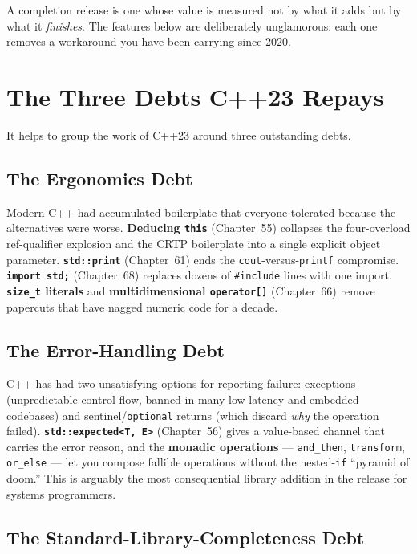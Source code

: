 A completion release is one whose value is measured not by what it adds but by what it \emph{finishes}. The features below are deliberately unglamorous: each one removes a workaround you have been carrying since 2020.

\section{The Three Debts C++23 Repays}

It helps to group the work of C++23 around three outstanding debts.

\subsection{The Ergonomics Debt}

Modern C++ had accumulated boilerplate that everyone tolerated because the alternatives were worse. \textbf{Deducing \lstinline|this|} (Chapter~55) collapses the four-overload ref-qualifier explosion and the CRTP boilerplate into a single explicit object parameter. \textbf{\lstinline|std::print|} (Chapter~61) ends the \lstinline|cout|-versus-\lstinline|printf| compromise. \textbf{\lstinline|import std;|} (Chapter~68) replaces dozens of \lstinline|#include| lines with one import. \textbf{\lstinline|size_t| literals} and \textbf{multidimensional \lstinline|operator[]|} (Chapter~66) remove papercuts that have nagged numeric code for a decade.

\subsection{The Error-Handling Debt}

C++ has had two unsatisfying options for reporting failure: exceptions (unpredictable control flow, banned in many low-latency and embedded codebases) and sentinel/\lstinline|optional| returns (which discard \emph{why} the operation failed). \textbf{\lstinline|std::expected<T, E>|} (Chapter~56) gives a value-based channel that carries the error reason, and the \textbf{monadic operations} --- \lstinline|and_then|, \lstinline|transform|, \lstinline|or_else| --- let you compose fallible operations without the nested-\lstinline|if| ``pyramid of doom.'' This is arguably the most consequential library addition in the release for systems programmers.

\subsection{The Standard-Library-Completeness Debt}

